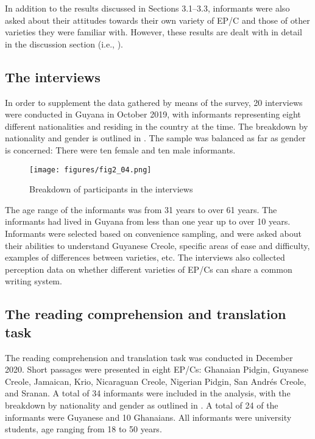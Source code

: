 \documentclass[output=paper,colorlinks,citecolor=brown]{langscibook}
\begin{document}
In addition to the results discussed in Sections 3.1–3.3, informants were also asked about their attitudes towards their own variety of EP/C and those of other varieties they were familiar with. However, these results are dealt with in detail in the discussion section (i.e., ).

\subsection{The interviews}\label{sec:4.2.2}

In order to supplement the data gathered by means of the survey, 20 interviews were conducted in Guyana in October 2019, with informants representing eight different nationalities and residing in the country at the time. The breakdown by nationality and gender is outlined in . The sample was balanced as far as gender is concerned: There were ten female and ten male informants.

\begin{figure}
    \texttt{[image: figures/fig2\_04.png]}
    \caption{Breakdown of participants in the interviews}
    \label{fig:fig2_04}
\end{figure}

The age range of the informants was from 31 years to over 61 years. The informants had lived in Guyana from less than one year up to over 10 years. Informants were selected based on convenience sampling, and were asked about their abilities to understand Guyanese Creole, specific areas of ease and difficulty, examples of differences between varieties, etc. The interviews also collected perception data on whether different varieties of EP/Cs can share a common writing system.


\subsection{The reading comprehension and translation task}\label{sec:4.2.3}

The reading comprehension and translation task was conducted in December 2020. Short passages were presented in eight EP/Cs: Ghanaian Pidgin, Guyanese Creole, Jamaican, Krio, Nicaraguan Creole, Nigerian Pidgin, San Andr\'es Creole, and Sranan. A total of 34 informants were included in the analysis, with the breakdown by nationality and gender as outlined in . A total of 24 of the informants were Guyanese and 10 Ghanaians. All informants were university students, age ranging from 18 to 50 years.
\end{document}
